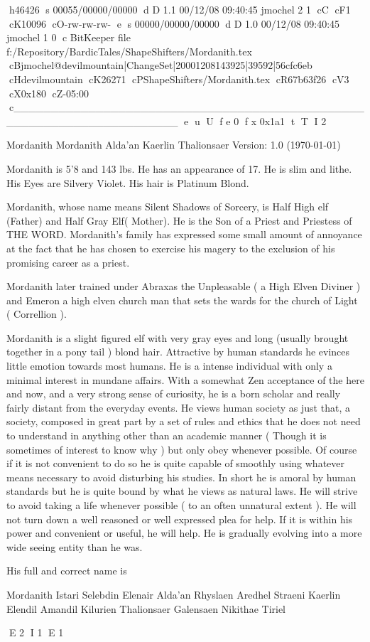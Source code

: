 h46426
s 00055/00000/00000
d D 1.1 00/12/08 09:40:45 jmochel 2 1
cC
cF1
cK10096
cO-rw-rw-rw-
e
s 00000/00000/00000
d D 1.0 00/12/08 09:40:45 jmochel 1 0
c BitKeeper file f:/Repository/BardicTales/ShapeShifters/Mordanith.tex
cBjmochel@devilmountain|ChangeSet|20001208143925|39592|56cfc6eb
cHdevilmountain
cK26271
cPShapeShifters/Mordanith.tex
cR67b63f26
cV3
cX0x180
cZ-05:00
c______________________________________________________________________
e
u
U
f e 0
f x 0x1a1
t
T
I 2





\def\cnotice{}
\def\manualname{Character Description}

\manpage Mordanith
Mordanith Alda'an Kaerlin Thalionsaer
Version: 1.0 (\today)


Mordanith is 5'8 and 143 lbs. He has an appearance of 17. He is
slim and lithe. His Eyes are Silvery Violet. His hair is Platinum Blond.

Mordanith, whose name means Silent Shadows of Sorcery, is Half High
elf (Father) and Half Gray Elf( Mother). He is the Son of a Priest
and Priestess of THE WORD. Mordanith's family has expressed some
small amount of annoyance at the fact that he has chosen to exercise
his magery to the exclusion of his promising career as a priest.

Mordanith later trained under Abraxas the Unpleasable ( a High Elven
Diviner ) and Emeron a high elven church man that sets the wards for
the church of Light ( Correllion ).

Mordanith is a slight figured elf with very gray eyes and long
(usually brought together in a pony tail ) blond hair. Attractive by
human standards he evinces little emotion towards most humans. He is
a intense individual with only a minimal interest in mundane affairs.
With a somewhat Zen acceptance of the here and now, and a very strong
sense of curiosity, he is a born scholar and really fairly distant
from the everyday events. He views human society as just that, a
society, composed in great part by a set of rules and ethics that he
does not need to understand in anything other than an academic manner
( Though it is sometimes of interest to know why ) but only obey
whenever possible. Of course if it is not convenient to do so he is
quite capable of smoothly using whatever means necessary to avoid
disturbing his studies. In short he is amoral by human standards but
he is quite bound by what he views as natural laws. He will strive to
avoid taking a life whenever possible ( to an often unnatural extent ).
He will not turn down a well reasoned or well expressed plea for help.
If it is within his power and convenient or useful, he will help.
He is gradually evolving into a more wide seeing entity than he was.

His full and correct name is

Mordanith Istari Selebdin Elenair
Alda'an Rhyslaen Aredhel Straeni
Kaerlin Elendil Amandil Kilurien
Thalionsaer Galensaen Nikithae Tiriel


\bye
E 2
I 1
E 1
